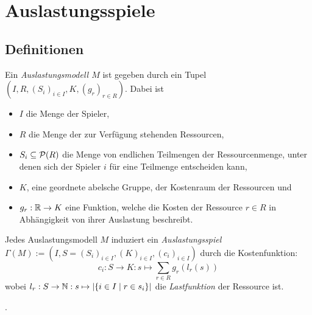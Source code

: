 \section{Auslastungsspiele}\label{sec:Auslastungsspiele}

\subsection{Definitionen}

\begin{defn}\label{def:Auslastungsmodel}
	Ein \emph{Auslastungsmodell $M$} ist gegeben durch ein Tupel $(I, R, (S_i)_{i\in I}, K, (g_r)_{r \in R})$. Dabei ist
	\begin{itemize}
		\item $I$ die Menge der Spieler,
		\item $R$ die Menge der zur Verfügung stehenden Ressourcen,
		\item $S_i \subseteq \mathcal{P}(R)$ die Menge von endlichen Teilmengen der Ressourcenmenge, unter denen sich der Spieler $i$ für eine Teilmenge entscheiden kann,
		\item $K$, eine geordnete abelsche Gruppe, der Kostenraum der Ressourcen und
		\item $g_r: \mathbb{R} \to K$ eine Funktion, welche die Kosten der Ressource $r \in R$ in Abhängigkeit von ihrer Auslastung beschreibt.
	\end{itemize}
\end{defn}

\begin{defn}\label{def:Auslastungsspiel}
	Jedes Auslastungsmodell $M$ induziert ein \emph{Auslastungsspiel} $\Gamma(M) := (I, S = (S_i)_{i\in I}, (K)_{i\in I}, (c_i)_{i \in I})$ durch die Kostenfunktion:
		\[c_i: S \to K: s \mapsto \sum_{r \in R} g_r(l_r(s)) \]
	wobei $l_r: S \to \mathbb{N}: s \mapsto \left|\{i\in I \mid r \in s_i\}\right|$ die \emph{Lastfunktion} der Ressource ist.
\end{defn}

\begin{bsp}.
	
\end{bsp}

